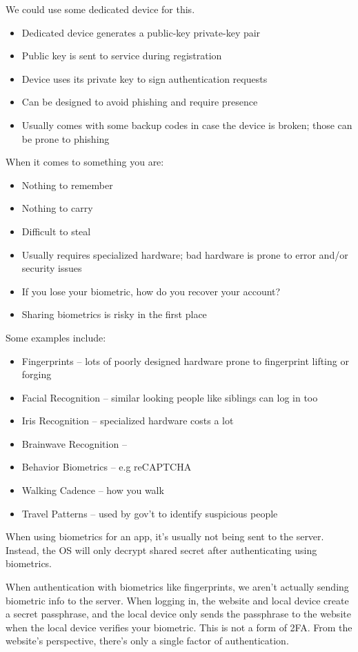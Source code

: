 We could use some dedicated device for this.
\begin{itemize}[noitemsep]
    \item Dedicated device generates a public-key private-key pair
    \item Public key is sent to service during registration
    \item Device uses its private key to sign authentication requests
    \item Can be designed to avoid phishing and require presence
    \item Usually comes with some backup codes in case the device is broken; those can be prone to phishing
\end{itemize}

When it comes to something you are:
\begin{itemize}[noitemsep]
    \item Nothing to remember
    \item Nothing to carry
    \item Difficult to steal
    \item Usually requires specialized hardware; bad hardware is prone to error and/or security issues
    \item If you lose your biometric, how do you recover your account?
    \item Sharing biometrics is risky in the first place
\end{itemize}

Some examples include:
\begin{itemize}[noitemsep]
    \item Fingerprints -- lots of poorly designed hardware prone to fingerprint lifting or forging
    \item Facial Recognition -- similar looking people like siblings can log in too
    \item Iris Recognition -- specialized hardware costs a lot
    \item Brainwave Recognition --
    \item Behavior Biometrics -- e.g reCAPTCHA
    \item Walking Cadence -- how you walk
    \item Travel Patterns -- used by gov't to identify suspicious people
\end{itemize}

When using biometrics for an app, it's usually not being sent to the server. Instead, the OS will only decrypt shared secret after authenticating using biometrics.

\begin{notebox}{}
    When authentication with biometrics like fingerprints, we aren't actually sending biometric info to the server. When logging in, the website and local device create a secret passphrase, and the local device only sends the passphrase to the website when the local device verifies your biometric. This is not a form of 2FA. From the website's perspective, there's only a single factor of authentication.
\end{notebox}

